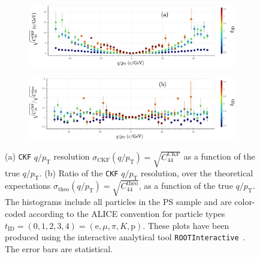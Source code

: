 \begin{figure}[!ht]
     \centering
     \begin{subfigure}[b]{0.99\textwidth}
         \centering
         \includegraphics[width=\textwidth]{figures/ch5-KF_NDGAr/ToySample/ParScan/TotVSExpVSpID_noNorm_label.eps}
         \caption{}
         \label{fig:CheckAna_pID_noNorm}
     \end{subfigure}
     \begin{subfigure}[b]{0.99\textwidth}
         \centering
         \includegraphics[width=\textwidth]{figures/ch5-KF_NDGAr/ToySample/ParScan/TotVSExpVSpID_label.eps}
         \caption{}
         \label{fig:CheckAna_pID_Norm}
     \end{subfigure}
        \caption[(a) \texttt{CKF} $q/p_{\text{T}}$ resolution $\sigma_{\text{CKF}}(q/p_{\text{T}})=\sqrt{C_{44}^{\textrm{CKF}}}$ as a function of the true $q/p_{\text{T}}$. (b) Ratio of the \texttt{CKF} $q/p_{\text{T}}$ resolution, over the theoretical expectations $\sigma_{\text{theo}}(q/p_\text{T})=\sqrt{C_{44}^{\textrm{theo}}}$, as a function of the true $q/p_\text{T}$.]{ (a) \texttt{CKF} $q/p_{\text{T}}$ resolution $\sigma_{\text{CKF}}(q/p_{\text{T}})=\sqrt{C_{44}^{\textrm{CKF}}}$ as a function of the true $q/p_{\text{T}}$. (b) Ratio of the \texttt{CKF} $q/p_{\text{T}}$ resolution, over the theoretical expectations $\sigma_{\text{theo}}(q/p_\text{T})=\sqrt{C_{44}^{\textrm{theo}}}$, as a function of the true $q/p_\text{T}$. The histograms include all particles in the PS sample and are color-coded according to the ALICE convention for particle types $t_\textrm{ID} = (0,1,2,3,4) = (\textrm{e},\mu,\pi,K,\textrm{p})$. These plots have been produced using the interactive analytical tool \texttt{ROOTInteractive}~\cite{RootInt}. The error bars are statistical.}
        \label{fig:Check_Ana_pID}
\end{figure}
